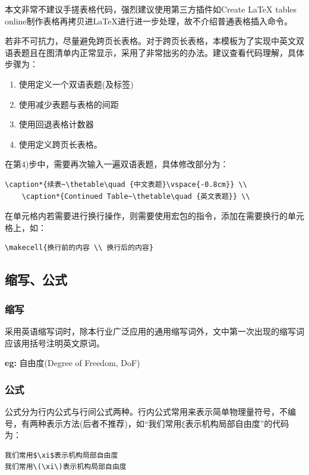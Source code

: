 本文非常不建议手搓表格代码，强烈建议使用第三方插件如Create LaTeX tables online\cite{TabCreateLaTeXta}制作表格再拷贝进\LaTeX{}进行进一步处理，故不介绍普通表格插入命令。

若非不可抗力，尽量避免跨页长表格。对于跨页长表格，本模板为了实现中英文双语表题且在图清单内正常显示，采用了非常拙劣的办法。建议查看代码理解，具体步骤为：
\begin{enumerate}
    \item 使用定义一个双语表题(及标签)
    \item 使用减少表题与表格的间距
    \item 使用回退表格计数器
    \item 使用定义跨页长表格。
\end{enumerate}
在第4)步中，需要再次输入一遍双语表题，具体修改部分为：

\begin{lstlisting}[language={[LaTeX]TeX}]
    \caption*{续表~\thetable\quad {中文表题}\vspace{-0.8cm}} \\
    \caption*{Continued Table~\thetable\quad {英文表题}} \\
\end{lstlisting}

在单元格内若需要进行换行操作，则需要使用宏包的指令，添加在需要换行的单元格上，如：

\begin{lstlisting}[language={[LaTeX]TeX}]
    \makecell{换行前的内容 \\ 换行后的内容}
\end{lstlisting}

\subsection{缩写、公式}

\subsubsection{缩写}
采用英语缩写词时，除本行业广泛应用的通用缩写词外，文中第一次出现的缩写词应该用括号注明英文原词。

\textbf{eg:} 自由度(Degree of Freedom, DoF)

\subsubsection{公式}
公式分为行内公式与行间公式两种。行内公式常用来表示简单物理量符号，不编号，有两种表示方法(后者不推荐)，如“我们常用$\xi$表示机构局部自由度”的代码为：
\begin{lstlisting}[language={[LaTeX]TeX}]
我们常用$\xi$表示机构局部自由度
我们常用\(\xi\)表示机构局部自由度
\end{lstlisting}

